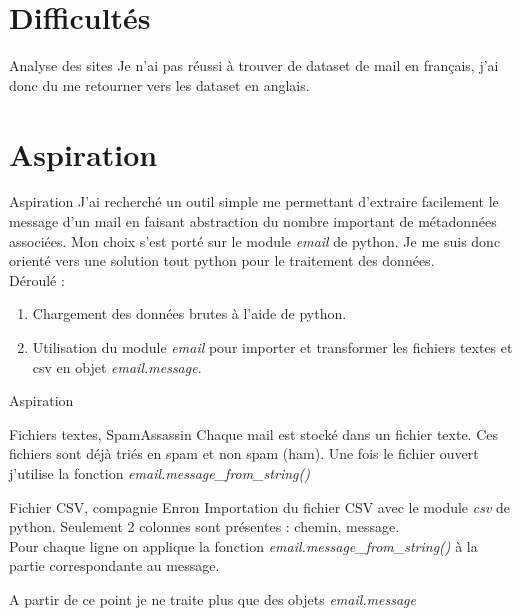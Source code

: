 \documentclass[xelatex,11pt, xcolor=dvipsnames]{beamer}
\begin{document}
\section{Difficultés}

\begin{frame}{Analyse des sites}
  Je n'ai pas réussi à trouver de dataset de mail en français, j'ai donc du me retourner vers les dataset en anglais.
\end{frame}

\section{Aspiration}

\begin{frame}{Aspiration}
	J'ai recherché un outil simple me permettant d'extraire facilement le message d'un mail en faisant abstraction du nombre important de métadonnées associées. Mon choix s'est porté sur le module \emph{email} de python. Je me suis donc orienté vers une solution tout python pour le traitement des données. \\
	Déroulé :
	\begin{enumerate}
		\item Chargement des données brutes à l'aide de python.
		\item Utilisation du module \emph{email} pour importer et transformer les fichiers textes et csv en objet \emph{email.message}.  
	\end{enumerate}
\end{frame}

\begin{frame}{Aspiration}
	\begin{block}{Fichiers textes, SpamAssassin}
	Chaque mail est stocké dans un fichier texte. Ces fichiers sont déjà triés en spam et non spam (ham).
	Une fois le fichier ouvert j'utilise la fonction \emph{email.message\_from\_string()}
	\end{block}
	
	\begin{block}{Fichier CSV, compagnie Enron}
	Importation du fichier CSV avec le module \emph{csv} de python.
	Seulement 2 colonnes sont présentes : chemin, message.\\
	Pour chaque ligne on applique la fonction \emph{email.message\_from\_string()} à la partie correspondante au message.
	\end{block}
	
	A partir de ce point je ne traite plus que des objets \emph{email.message}
	
\end{frame}
\end{document}
